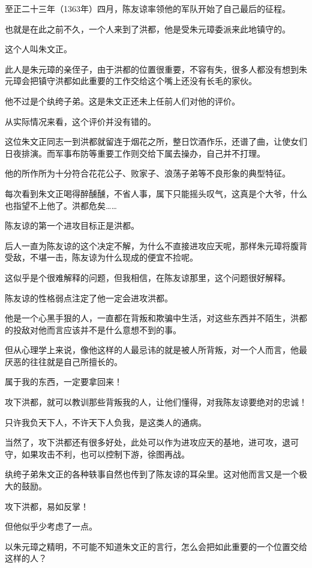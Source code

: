 	\begin{multicols}{\theparacolNo}
		\fi
		至正二十三年（1363年）四月，陈友谅率领他的军队开始了自己最后的征程。

		也就是在此之前不久，一个人来到了洪都，他是受朱元璋委派来此地镇守的。

		这个人叫朱文正。

		此人是朱元璋的亲侄子，由于洪都的位置很重要，不容有失，很多人都没有想到朱元璋会把镇守洪都如此重要的工作交给这个嘴上还没有长毛的家伙。

		他不过是个纨绔子弟。这是朱文正还未上任前人们对他的评价。

		从实际情况来看，这个评价并没有错的。

		这位朱文正同志一到洪都就留连于烟花之所，整日饮酒作乐，还谱了曲，让使女们日夜排演。而军事布防等重要工作则交给下属去操办，自己并不打理。

		他的所作所为十分符合花花公子、败家子、浪荡子弟等不良形象的典型特征。

		每次看到朱文正喝得醉醺醺，不省人事，属下只能摇头叹气，这真是个大爷，什么也指望不上他了。洪都危矣……

		陈友谅的第一个进攻目标正是洪都。

		后人一直为陈友谅的这个决定不解，为什么不直接进攻应天呢，那样朱元璋将腹背受敌，不堪一击，陈友谅为什么现成的便宜不捡呢。

		这似乎是个很难解释的问题，但我相信，在陈友谅那里，这个问题很好解释。

		陈友谅的性格弱点注定了他一定会进攻洪都。

		他是一个心黑手狠的人，一直都在背叛和欺骗中生活，对这些东西并不陌生，洪都的投敌对他而言应该并不是什么意想不到的事。

		但从心理学上来说，像他这样的人最忌讳的就是被人所背叛，对一个人而言，他最厌恶的往往就是自己所擅长的。

		属于我的东西，一定要拿回来！

		攻下洪都，就可以教训那些背叛我的人，让他们懂得，对我陈友谅要绝对的忠诚！

		只许我负天下人，不许天下人负我，是这类人的通病。

		当然了，攻下洪都还有很多好处，此处可以作为进攻应天的基地，进可攻，退可守，如果攻击不利，也可以控制下游，徐图再战。

		纨绔子弟朱文正的各种轶事自然也传到了陈友谅的耳朵里。这对他而言又是一个极大的鼓励。

		攻下洪都，易如反掌！

		但他似乎少考虑了一点。

		以朱元璋之精明，不可能不知道朱文正的言行，怎么会把如此重要的一个位置交给这样的人？


\end{multicols}
